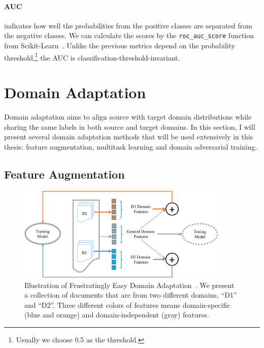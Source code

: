 \paragraph{AUC} indicates how well the probabilities from the positive classes are separated from the negative classes. 
We can calculate the scores by the \texttt{roc\_auc\_score} function from Scikit-Learn~\cite{pedregosa2011scikit}.
Unlike the previous metrics depend on the probability threshold,\footnote{Usually we choose 0.5 as the threshold.} the AUC is classification-threshold-invariant.




\section{Domain Adaptation}
\label{chap2:sec:domain_adpt}
Domain adaptation aims to align source with target domain distributions while sharing the same labels in both source and target domains.
In this section, I will present several domain adaptation methods that will be used extensively in this thesis: feature augmentation, multitask learning and domain adversarial training.


\subsection{Feature Augmentation}
\label{chap2:subsec:feaaug}

\begin{figure}[tb!]
\centering
\includegraphics[width=0.90\textwidth]{images/chapter2/feature-aug.pdf}
\caption{Illustration of Frustratingly Easy Domain Adaptation~\cite{daume2007frustratingly}. We present a collection of documents that are from two different domains, ``D1'' and ``D2''. Three different colors of features means domain-specific (blue and orange) and domain-independent (gray) features. }
\label{chap2:fig:aug}
\end{figure}


